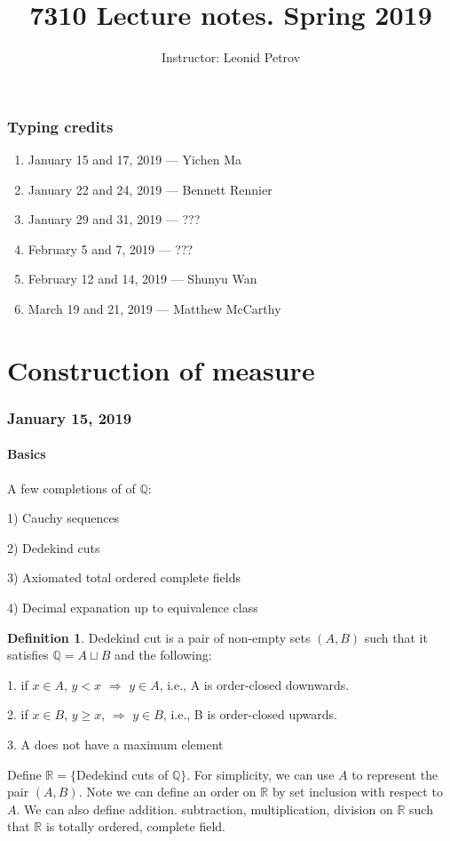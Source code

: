\documentclass{article}
\title{7310 Lecture notes. Spring 2019}
\author{Instructor: Leonid Petrov}
\date{}
\theoremstyle{definition}
\newtheorem{definition}[theorem]{Definition}
\begin{document}
\maketitle

\section*{Typing credits}

\begin{enumerate}
	\item January 15 and 17, 2019 --- Yichen Ma
	\item January 22 and 24, 2019 --- Bennett Rennier
	\item January 29 and 31, 2019 --- ???
	\item February 5 and 7, 2019 --- ???
	\item February 12 and 14, 2019 --- Shunyu Wan
	\item March 19 and 21, 2019 --- Matthew McCarthy
\end{enumerate}

\tableofcontents

\part{Construction of measure}

\section{January 15, 2019}

\subsection{Basics}

A few completions of of $\mathbb{Q}$:

1) Cauchy sequences

2) Dedekind cuts

3) Axiomated total ordered complete fields

4) Decimal expanation up to equivalence class


\begin{definition}
Dedekind cut is a pair of non-empty sets $(A,B)$ such that it satisfies $\mathbb{Q} = A \sqcup B$ and the following:

1. if $x \in A$, $y < x$ $\Longrightarrow$ $y \in A$, i.e., A is order-closed downwards.

2. if $x \in B$, $y \geq x$, $\Longrightarrow$ $y \in B$, i.e., B is order-closed upwards.

3. A does not have a maximum element
\end{definition}
Define $\mathbb{R} = \{$Dedekind cuts of $\mathbb{Q}\}$. For simplicity, we can use $A$ to represent the pair $(A,B)$. Note we can define an order on $\mathbb{R}$ by set inclusion with respect to $A$. We can also define addition. subtraction, multiplication, division on $\mathbb{R}$ such that $\mathbb{R}$ is totally ordered, complete field.
\end{document}
